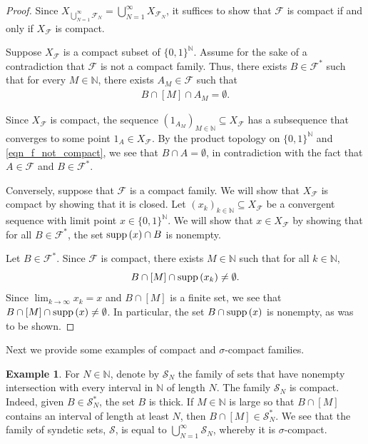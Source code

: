 \documentclass[letter,11pt]{article}
\theoremstyle{plain}
\theoremstyle{definition}
\newtheorem{example}[theorem]{Example}
\theoremstyle{plain}
\theoremstyle{plain}
\numberwithin{equation}{section}
\newcommand{\supp}{{\normalfont\text{supp}}\,}
\newcommand{\N}{\mathbb{N}}
\newcommand{\syndetic}{\mathcal{S}}
\newcommand{\class}{\mathscr{F}}
\newcommand{\family}{\mathscr{F}}
\begin{document}
\begin{proof}
Since $X_{\bigcup_{N=1}^\infty \family_N} = \bigcup_{N = 1}^\infty X_{\family_N}$, it suffices to show that $\family$ is compact if and only if $X_{\class}$ is compact.


Suppose $X_{\class}$ is a compact subset of $\{0, 1\}^{\N}$. Assume for the sake of a contradiction that $\class$ is not a compact family. Thus, there exists $B \in \family^*$ such that for every $M \in \N$, there exists $A_M \in \family$ such that
\begin{align}
\label{eqn_f_not_compact}
    B \cap [M] \cap A_M = \emptyset.
\end{align}

Since $X_{\family}$ is compact, the sequence $(1_{A_M})_{M \in \N} \subseteq X_{\family}$ has a subsequence that converges to some point $1_A \in X_{\family}$. By the product topology on $\{0,1\}^{\N}$ and \eqref{eqn_f_not_compact}, we see that $B \cap A = \emptyset$, in contradiction with the fact that $A \in \family$ and $B \in \family^*$. 

Conversely, suppose that $\family$ is a compact family. We will show that $X_{\family}$ is compact by showing that it is closed. Let $(x_k)_{k \in \N} \subseteq X_{\family}$ be a convergent sequence with limit point $x \in \{0,1\}^{\N}$. We will show that $x \in X_{\family}$ by showing that for all $B \in \family^*$, the set $\supp(x) \cap B$ is nonempty.

Let $B \in \family^*$.  Since $\family$ is compact, there exists $M \in \N$ such that for all $k \in \N$,
\[
    B \cap [M] \cap \supp(x_k) \neq \emptyset.
\]
Since $\lim_{k \to \infty}x_k = x$ and $B \cap [M]$ is a finite set, we see that $B \cap [M] \cap \supp(x) \neq \emptyset$. In particular, the set $B \cap \supp(x)$ is nonempty, as was to be shown.
\end{proof}


Next we provide some examples of compact and $\sigma$-compact families.

\begin{example}
\label{ex_syndetic_is_sigma_compact}
    For $N \in \N$, denote by $\syndetic_N$ the family of sets that have nonempty intersection with every interval in $\N$ of length $N$.  The family $\syndetic_N$ is compact.  Indeed, given $B \in \syndetic_N^*$, the set $B$ is thick.  If $M \in \N$ is large so that $B \cap [M]$ contains an interval of length at least $N$, then $B \cap [M] \in \syndetic_N^*$.  We see that the family of syndetic sets, $\syndetic$, is equal to $\bigcup_{N=1}^\infty \syndetic_N$, whereby it is $\sigma$-compact.
\end{example}
\end{document}
